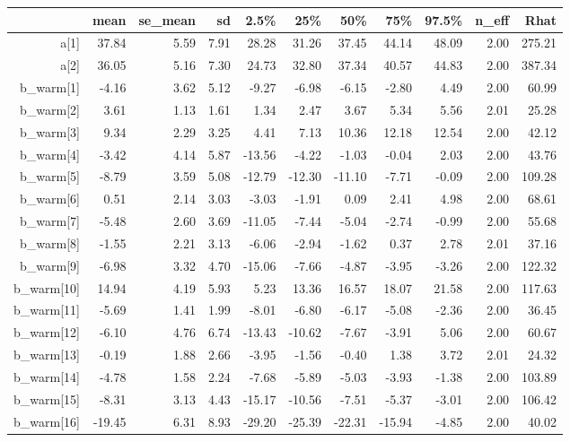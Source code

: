 \documentclass[11pt]{article}
\begin{document}
\begin{table}[ht]
\centering
\begin{tabular}{rrrrrrrrrrr}
  \hline
 & mean & se\_mean & sd & 2.5\% & 25\% & 50\% & 75\% & 97.5\% & n\_eff & Rhat \\ 
  \hline
a[1] & 37.84 & 5.59 & 7.91 & 28.28 & 31.26 & 37.45 & 44.14 & 48.09 & 2.00 & 275.21 \\ 
  a[2] & 36.05 & 5.16 & 7.30 & 24.73 & 32.80 & 37.34 & 40.57 & 44.83 & 2.00 & 387.34 \\ 
  b\_warm[1] & -4.16 & 3.62 & 5.12 & -9.27 & -6.98 & -6.15 & -2.80 & 4.49 & 2.00 & 60.99 \\ 
  b\_warm[2] & 3.61 & 1.13 & 1.61 & 1.34 & 2.47 & 3.67 & 5.34 & 5.56 & 2.01 & 25.28 \\ 
  b\_warm[3] & 9.34 & 2.29 & 3.25 & 4.41 & 7.13 & 10.36 & 12.18 & 12.54 & 2.00 & 42.12 \\ 
  b\_warm[4] & -3.42 & 4.14 & 5.87 & -13.56 & -4.22 & -1.03 & -0.04 & 2.03 & 2.00 & 43.76 \\ 
  b\_warm[5] & -8.79 & 3.59 & 5.08 & -12.79 & -12.30 & -11.10 & -7.71 & -0.09 & 2.00 & 109.28 \\ 
  b\_warm[6] & 0.51 & 2.14 & 3.03 & -3.03 & -1.91 & 0.09 & 2.41 & 4.98 & 2.00 & 68.61 \\ 
  b\_warm[7] & -5.48 & 2.60 & 3.69 & -11.05 & -7.44 & -5.04 & -2.74 & -0.99 & 2.00 & 55.68 \\ 
  b\_warm[8] & -1.55 & 2.21 & 3.13 & -6.06 & -2.94 & -1.62 & 0.37 & 2.78 & 2.01 & 37.16 \\ 
  b\_warm[9] & -6.98 & 3.32 & 4.70 & -15.06 & -7.66 & -4.87 & -3.95 & -3.26 & 2.00 & 122.32 \\ 
  b\_warm[10] & 14.94 & 4.19 & 5.93 & 5.23 & 13.36 & 16.57 & 18.07 & 21.58 & 2.00 & 117.63 \\ 
  b\_warm[11] & -5.69 & 1.41 & 1.99 & -8.01 & -6.80 & -6.17 & -5.08 & -2.36 & 2.00 & 36.45 \\ 
  b\_warm[12] & -6.10 & 4.76 & 6.74 & -13.43 & -10.62 & -7.67 & -3.91 & 5.06 & 2.00 & 60.67 \\ 
  b\_warm[13] & -0.19 & 1.88 & 2.66 & -3.95 & -1.56 & -0.40 & 1.38 & 3.72 & 2.01 & 24.32 \\ 
  b\_warm[14] & -4.78 & 1.58 & 2.24 & -7.68 & -5.89 & -5.03 & -3.93 & -1.38 & 2.00 & 103.89 \\ 
  b\_warm[15] & -8.31 & 3.13 & 4.43 & -15.17 & -10.56 & -7.51 & -5.37 & -3.01 & 2.00 & 106.42 \\ 
  b\_warm[16] & -19.45 & 6.31 & 8.93 & -29.20 & -25.39 & -22.31 & -15.94 & -4.85 & 2.00 & 40.02 \\ 

\end{tabular}
\end{table}
\end{document}
